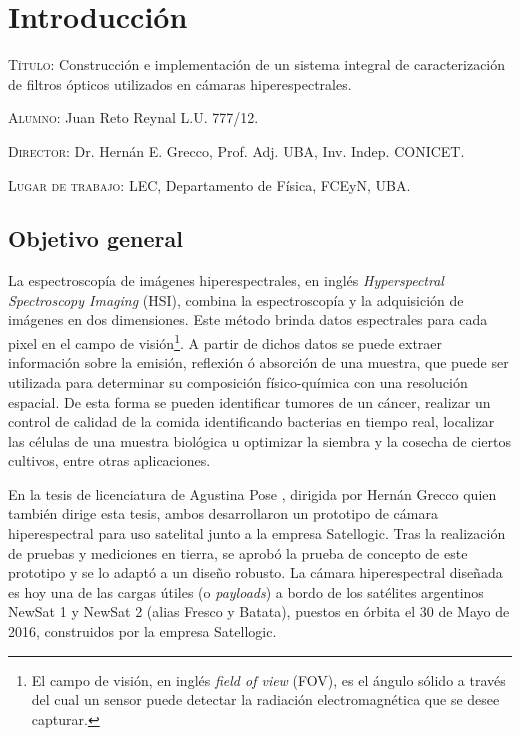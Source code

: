 \documentclass{ctuthesis}
\begin{document}
	


\maketitle

\renewcommand{\chaptername}{Capítulo}
\renewcommand{\figurename}{Figura}
\chapter{Introducción}


\textsc{Título:} Construcción e implementación de un sistema integral de 
caracterización de filtros ópticos utilizados en cámaras hiperespectrales.


\hspace{-0.4cm}\textsc{Alumno:} Juan Reto Reynal L.U. 777/12.

\hspace{-0.4cm}\textsc{Director:} Dr. Hernán E. Grecco, 
Prof. Adj. UBA, Inv. Indep. CONICET.

\hspace{-0.4cm}\textsc{Lugar de trabajo:} LEC, Departamento de Física, FCEyN, UBA.


\section*{Objetivo general}
\hspace{0.5cm}La espectroscopía de imágenes hiperespectrales, en inglés 
\textit{Hyperspectral 
Spectroscopy Imaging} (HSI), combina la espectroscopía y la adquisición de 
imágenes 
en dos dimensiones. Este método brinda datos espectrales para cada 
pixel en el campo de 
visión\footnote{El campo de visión, en inglés \textit{field of view} (FOV), es 
el ángulo sólido a través del cual un sensor puede detectar la radiación 
electromagnética que se desee capturar.}. A partir de dichos 
datos se puede extraer información sobre la emisión, reflexión ó absorción de 
una muestra, que puede ser utilizada para determinar su 
composición físico-química con una resolución espacial. De esta forma se pueden 
identificar tumores de un cáncer, realizar un control de calidad de la comida 
identificando bacterias en tiempo real, localizar las células de una muestra 
biológica u optimizar la siembra y la cosecha de ciertos cultivos, entre otras 
aplicaciones.


En la tesis de licenciatura de Agustina Pose \cite{Pose2017}, dirigida 
por 
Hernán Grecco quien también dirige esta tesis, ambos desarrollaron un prototipo 
de cámara hiperespectral para uso satelital junto a la empresa Satellogic. Tras 
la realización de pruebas y mediciones en tierra, se aprobó la 
prueba de concepto de este prototipo y se lo adaptó a un diseño robusto. La 
cámara hiperespectral diseñada es hoy una de las cargas útiles (o 
\textit{payloads}) a bordo de los satélites argentinos NewSat 1 y NewSat 2 
(alias Fresco y Batata), puestos en órbita el 30 de Mayo de 2016, construidos 
por la empresa Satellogic.
\end{document}
